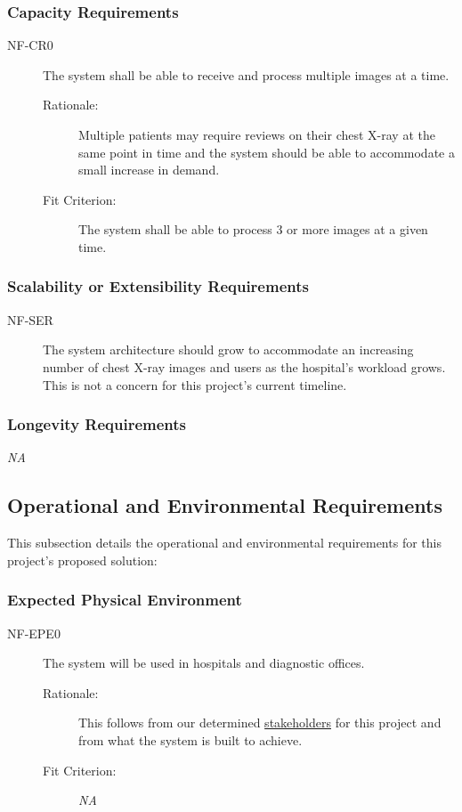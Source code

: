 \documentclass[12pt]{article}
\begin{document}
\subsubsection{Capacity Requirements}
\begin{description}
    \item[NF-CR0] The system shall be able to receive and process multiple images at a time. 
    \begin{description}
        \item[Rationale:] Multiple patients may require reviews on their chest X-ray at the same point in time and the system should be able to accommodate a small increase in demand. 
        \item[Fit Criterion:] The system shall be able to process 3 or more images at a given time.
    \end{description}
\end{description}

\subsubsection{Scalability or Extensibility Requirements}
\begin{description}
    \item[NF-SER] The system architecture should grow to accommodate an increasing number of chest X-ray images and users as the hospital's workload grows. This is not a concern for this project's current timeline. 
\end{description}


\subsubsection{Longevity Requirements}
\textit{NA}

\subsection{Operational and Environmental Requirements}
This subsection details the operational and environmental requirements for this project's proposed solution:

\subsubsection{Expected Physical Environment}
\begin{description}
    \item[NF-EPE0] The system will be used in hospitals and diagnostic offices. 
    \begin{description}
        \item[Rationale:] This follows from our determined \hyperlink{Users}{stakeholders} for this project and from what the system is built to achieve. 
        \item[Fit Criterion:] \textit{NA}
    \end{description}
\end{description}
\end{document}
